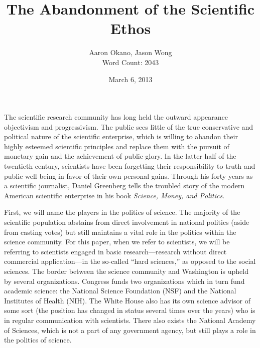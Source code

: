 \documentclass{article}[12pt]
\title{The Abandonment of the Scientific Ethos}  %
\author{Aaron Okano, Jason Wong\\Word Count: 2043 }    %
\date{March 6, 2013}   %
\begin{document}

\maketitle                 %

﻿The scientific research community has long held the outward appearance
objectivism and progressivism. The public sees little of the true conservative
and political nature of the scientific enterprise, which is willing to abandon
their highly esteemed scientific principles and replace them with the pursuit
of monetary gain and the achievement of public glory. In the latter half of the
twentieth century, scientists have been forgetting their responsibility to
truth and public well-being in favor of their own personal gains. Through his
forty years as a scientific journalist, Daniel Greenberg tells the troubled
story of the modern American scientific enterprise in his book \emph{Science,
Money, and Politics}.

First, we will name the players in the politics of science. The majority of the
scientific population abstains from direct involvement in national politics
(aside from casting votes) but still maintains a vital role in the politics
within the science community. For this paper, when we refer to scientists, we
will be referring to scientists engaged in basic research---research without
direct commercial application---in the so-called ``hard sciences,'' as opposed
to the social sciences. The border between the science community and Washington
is upheld by several organizations. Congress funds two organizations which in
turn fund academic science: the National Science Foundation (NSF) and the
National Institutes of Health (NIH). The White House also has its own science
advisor of some sort (the position has changed in status several times over the
years) who is in regular communication with scientists. There also exists the
National Academy of Sciences, which is not a part of any government agency, but
still plays a role in the politics of science.
\end{document}
